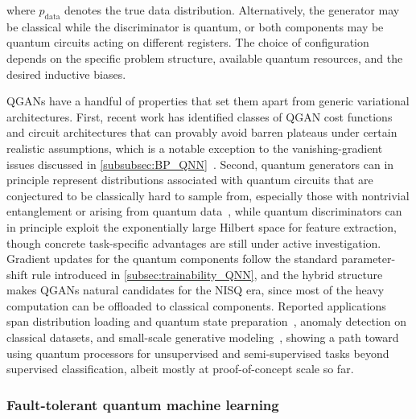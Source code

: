 \documentclass[aps,10pt,groupedaddress,prx,superscriptaddress,twocolumn,balancelastpage, tightenlines]{revtex4-2}
\theoremstyle{plain}  %
\begin{document}
where $p_{\text{data}}$ denotes the true data distribution.
Alternatively, the generator may be classical while the discriminator is
quantum, or both components may be quantum circuits acting on different
registers. The choice of configuration depends on the specific problem
structure, available quantum resources, and the desired inductive biases.

QGANs have a handful of properties that set them apart from generic
variational architectures. First, recent work has identified classes of QGAN cost functions and circuit architectures that can provably avoid barren plateaus under certain realistic assumptions, which is a notable exception to the vanishing-gradient issues discussed in \autoref{subsubsec:BP_QNN}~\cite{letcher_tight_2024,
Cerezo_2021_cost_BP}. Second, quantum generators can in principle represent distributions associated with quantum circuits that are conjectured to be classically hard to sample from, especially those with nontrivial entanglement or arising from quantum data~\cite{arute2019quantum}, while quantum discriminators
can in principle exploit the exponentially large Hilbert space for
feature extraction, though concrete task-specific advantages are still
under active investigation. Gradient updates for the quantum components
follow the standard parameter-shift rule introduced in
\autoref{subsec:trainability_QNN}, and the hybrid structure makes
QGANs natural candidates for the \gls{NISQ} era, since most of the
heavy computation can be offloaded to classical components. Reported
applications span distribution loading and quantum state
preparation~\cite{zoufal2019quantum}, anomaly detection on classical
datasets, and small-scale generative modeling~\cite{Benedetti2018Unsupervised}, showing a path toward using quantum processors for unsupervised and semi-supervised tasks beyond supervised classification, albeit mostly at proof-of-concept scale so far.

\subsubsection{Fault-tolerant quantum machine learning}\label{subsubsec:FTQC_QML}
\end{document}
